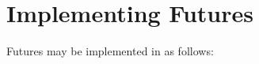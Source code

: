 \section{Implementing Futures}\label{FutureImplementation}

Futures may be implemented in \Xten{} as follows:

